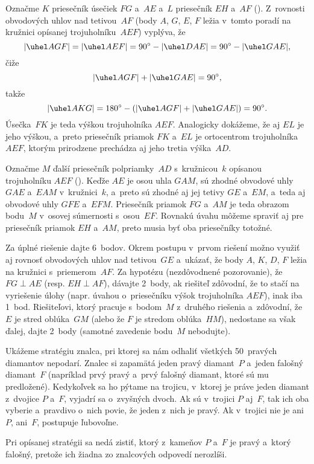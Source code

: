{%
Označme $K$ priesečník úsečiek $FG$ a~$AE$ a~$L$ priesečník $EH$ a~$AF$ (\obr).
Z~rovnosti obvodových uhlov nad tetivou~$AF$ (body $A$, $G$, $E$, $F$
ležia v~tomto poradí na kružnici opísanej trojuholníku~$AEF$) vyplýva, že
$$
|\uhel AGF |=|\uhel AEF |= 90^\circ-|\uhel DAE |= 90^\circ-|\uhel GAE |,
$$
čiže
$$
|\uhel AGF |+|\uhel GAE |=90^\circ,
$$
takže
$$
|\uhel AKG |= 180^\circ-(|\uhel AGF |+|\uhel GAE |) = 90^\circ.
$$
Úsečka~$FK$ je teda výškou trojuholníka $AEF$.
Analogicky dokážeme, že aj $EL$ je jeho výškou,
a~preto priesečník priamok $FK$ a~$EL$ je ortocentrom trojuholníka $AEF$,
ktorým prirodzene prechádza aj jeho tretia výška~$AD$.
%

\ineriesenie
Označme $M$ ďalší priesečník polpriamky~$AD$ s~kružnicou~$k$
opísanou trojuholníku $AEF$ ().
Keďže $AE$ je osou uhla $GAM$, sú zhodné obvodové uhly $GAE$ a~$EAM$
v~kružnici~$k$, a~preto sú zhodné aj jej tetivy $GE$ a~$EM$,
a~teda aj obvodové uhly $GFE$ a~$EFM$.
Priesečník
priamok $FG$ a~$AM$ je teda obrazom bodu~$M$ v~osovej súmernosti s~osou~$EF$.
Rovnakú úvahu môžeme spraviť aj pre priesečník priamok $EH$ a~$AM$, preto
musia byť oba priesečníky totožné.


\nobreak\medskip\petit\noindent
Za úplné riešenie dajte 6~bodov. Okrem postupu v~prvom riešení
možno využiť aj rovnosť obvodových uhlov nad tetivou~$GE$ a~ukázať,
že body $A$, $K$, $D$, $F$ ležia na kružnici s~priemerom~$AF$. Za hypotézu (nezdôvodnené
pozorovanie), že $FG \perp AE$ (resp. $EH \perp AF$), dávajte 2~body, ak
riešiteľ zdôvodní, že to stačí na vyriešenie úlohy (napr.
úvahou o~priesečníku výšok trojuholníka $AEF$), inak iba 1~bod. Riešiteľovi, ktorý
pracuje s~bodom~$M$ z~druhého riešenia a~zdôvodní, že $E$ je
stred oblúka~$GM$ (alebo že $F$ je stredom oblúka~$HM$),
nedostane sa však ďalej, dajte 2~body (samotné zavedenie bodu~$M$ nebodujte).
\endpetit
\bigbreak
}

{%
Ukážeme stratégiu znalca, pri ktorej sa nám odhaliť všetkých 50~pravých
diamantov nepodarí. Znalec si zapamätá jeden pravý diamant~$P$ a~jeden falošný
diamant~$F$ (napríklad prvý pravý a~prvý falošný diamant, ktoré sú mu
predložené). Kedykoľvek sa ho pýtame na trojicu, v~ktorej je práve jeden
diamant z~dvojice $P$ a~$F$, vyjadrí sa o~zvyšných dvoch.
Ak sú v~trojici $P$ aj~$F$, tak ich oba vyberie a~pravdivo o~nich
povie, že jeden z~nich je pravý. Ak v~trojici nie je ani~$P$, ani~$F$,
postupuje ľubovoľne.

Pri opísanej stratégii sa nedá zistiť, ktorý z~kameňov $P$ a~$F$ je pravý a~ktorý
falošný, pretože ich žiadna zo znalcových odpovedí nerozlíši.
}

